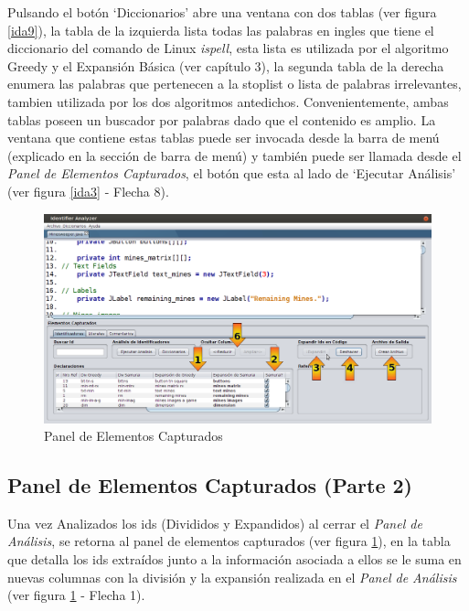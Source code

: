 \documentclass[a4paper,12pt]{report}
\begin{document}
Pulsando el botón `Diccionarios' abre una ventana con dos tablas (ver figura \ref{ida9}), la tabla de la izquierda lista todas las palabras en ingles que tiene el diccionario del comando de Linux \textit{ispell}, esta lista es utilizada por el algoritmo Greedy y el Expansión Básica (ver capítulo 3), la segunda tabla de la derecha enumera las palabras que pertenecen a la stoplist o lista de palabras irrelevantes, tambien utilizada por los dos algoritmos antedichos. Convenientemente, ambas tablas poseen un buscador por palabras dado que el contenido es amplio. La ventana que contiene estas tablas puede ser invocada desde la barra de menú (explicado en la sección de barra de menú) y también puede ser llamada desde el \textit{Panel de Elementos Capturados}, el botón que esta al lado de `Ejecutar Análisis' (ver figura \ref{ida3} - Flecha 8).

\begin{figure}[t] %
\centerline{%
\includegraphics[scale= 0.5]{./ida_10.png}
}
\caption{Panel de Elementos Capturados}
\label{ida10}
\end{figure}

\subsection{Panel de Elementos Capturados (Parte 2)}

Una vez Analizados los ids (Divididos y Expandidos) al cerrar el \textit{Panel de Análisis}, se retorna al panel de elementos capturados (ver figura \ref{ida10}), en la tabla que detalla los ids extraídos junto a la información asociada a ellos se le suma en nuevas columnas con la división y la expansión realizada en el \textit{Panel de Análisis} (ver figura \ref{ida10} - Flecha 1).
\end{document}
